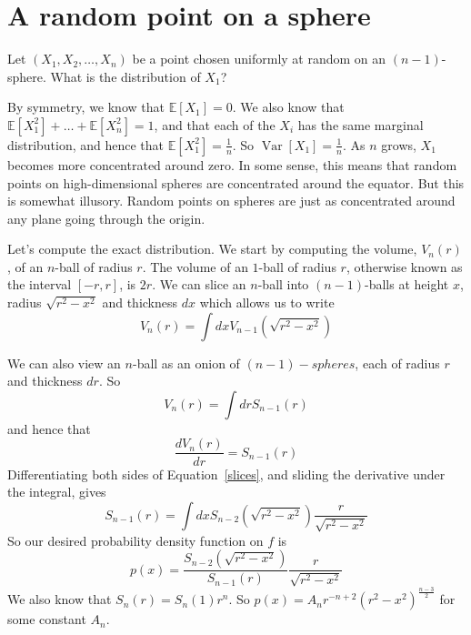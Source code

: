 \documentclass[tikz]{article}
\newcommand\bbe{\mathbb{E}}
\newcommand\var{\mathop{\mathrm{Var}}}
\begin{document}
\section{A random point on a sphere}
Let $(X_1,X_2,\ldots,X_n)$ be a point chosen uniformly at random on an $(n-1)$-sphere.
What is the distribution of $X_1$?

By symmetry, we know that $\bbe[X_1]=0$.
We also know that $\bbe[X_1^2]+\ldots+\bbe[X_n^2]=1$, and that each of the $X_i$ has the same marginal distribution, and hence that $\bbe[X_1^2]=\frac{1}{n}$.
So $\var[X_1]=\frac{1}{n}$.
As $n$ grows, $X_1$ becomes more concentrated around zero.
In some sense, this means that random points on high-dimensional spheres are concentrated around the equator.
But this is somewhat illusory.
Random points on spheres are just as concentrated around any plane going through the origin.

Let's compute the exact distribution.
We start by computing the volume, $V_n(r)$, of an $n$-ball of radius $r$.
The volume of an $1$-ball of radius $r$, otherwise known as the interval $[-r, r]$, is $2r$.
We can slice an $n$-ball into $(n-1)$-balls at height $x$, radius $\sqrt{r^2-x^2}$ and thickness $dx$ which allows us to write
\begin{equation}
V_n(r) = \int dx V_{n-1}(\sqrt{r^2-x^2})
\label{slices}
\end{equation}

We can also view an $n$-ball as an onion of $(n-1)-spheres$, each of radius $r$ and thickness $dr$.
So
\[
V_n(r) = \int dr S_{n-1}(r)
\]
and hence that
\[
\frac{dV_n(r)}{dr} = S_{n-1}(r)
\]
Differentiating both sides of Equation~\ref{slices}, and sliding the derivative under the integral, gives
\[
S_{n-1}(r) = \int dx S_{n-2}(\sqrt{r^2-x^2})\frac{r}{\sqrt{r^2-x^2}}
\]
So our desired probability density function on $f$ is
\[
p(x) = \frac{S_{n-2}(\sqrt{r^2-x^2})}{S_{n-1}(r)}\frac{r}{\sqrt{r^2-x^2}}
\]
We also know that $S_n(r)=S_n(1)r^n$.
So $p(x) = A_n r^{-n+2}(r^2-x^2)^\frac{n-3}{2}$ for some constant $A_n$.


\end{document}
